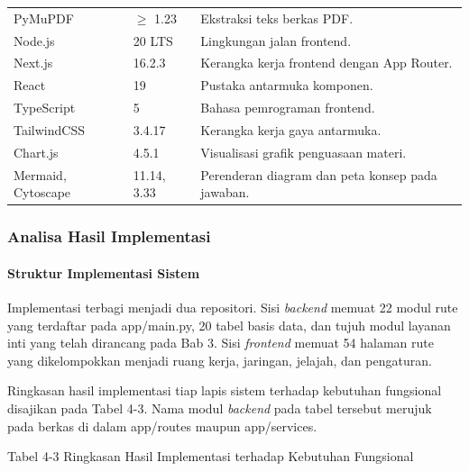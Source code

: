 \documentclass[12pt,a4paper]{article}
\begin{document}
\begin{table}[h]
\begin{tabular}{lll}
PyMuPDF & $\ge$ 1.23 & Ekstraksi teks berkas PDF. \\

Node.js & 20 LTS & Lingkungan jalan frontend. \\

Next.js & 16.2.3 & Kerangka kerja frontend dengan App Router. \\

React & 19 & Pustaka antarmuka komponen. \\

TypeScript & 5 & Bahasa pemrograman frontend. \\

TailwindCSS & 3.4.17 & Kerangka kerja gaya antarmuka. \\

Chart.js & 4.5.1 & Visualisasi grafik penguasaan materi. \\

Mermaid, Cytoscape & 11.14, 3.33 & Perenderan diagram dan peta konsep pada jawaban. \\

\bottomrule

\end{tabular}

\end{table}

\subsubsection*{Analisa Hasil Implementasi}

\paragraph*{Struktur Implementasi Sistem}

Implementasi terbagi menjadi dua repositori. Sisi \textit{backend} memuat 22 modul rute yang terdaftar pada app/main.py, 20 tabel basis data, dan tujuh modul layanan inti yang telah dirancang pada Bab 3. Sisi \textit{frontend} memuat 54 halaman rute yang dikelompokkan menjadi ruang kerja, jaringan, jelajah, dan pengaturan.



Ringkasan hasil implementasi tiap lapis sistem terhadap kebutuhan fungsional disajikan pada Tabel 4-3. Nama modul \textit{backend} pada tabel tersebut merujuk pada berkas di dalam app/routes maupun app/services.



Tabel 4-3	Ringkasan Hasil Implementasi terhadap Kebutuhan Fungsional
\end{document}
